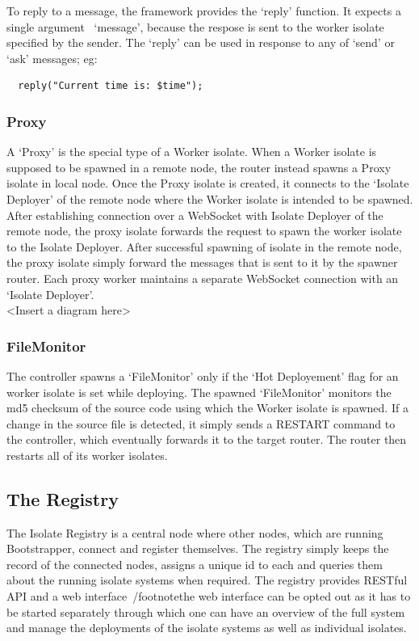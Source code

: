   To reply to a message, the framework provides the ‘reply’ function. It expects a single argument~\textemdash{} ‘message’, because the respose is sent to the worker isolate specified by the sender. The ‘reply’ can be used in response to any of ‘send’ or ‘ask’ messages; eg:
\begin{lstlisting}
  reply("Current time is: $time");
\end{lstlisting}

  \subsubsection{Proxy}
  A ‘Proxy’ is the special type of a Worker isolate. When a Worker isolate is supposed to be spawned in a remote node, the router instead spawns a Proxy isolate in local node. Once the Proxy isolate is created, it connects to the ‘Isolate Deployer’ of the remote node where the Worker isolate is intended to be spawned. After establishing connection over a WebSocket with Isolate Deployer of the remote node, the proxy isolate forwards the request to spawn the worker isolate to the Isolate Deployer. After successful spawning of isolate in the remote node, the proxy isolate simply forward the messages that is sent to it by the spawner router. Each proxy worker maintains a separate WebSocket connection with an ‘Isolate Deployer’.\\
  <Insert a diagram here>

  \subsubsection{FileMonitor}
  \label{subsubsec:fileMonitor}
  The controller spawns a ‘FileMonitor’ only if the ‘Hot Deployement’ flag for an worker isolate is set while deploying. The spawned ‘FileMonitor’ monitors the md5 checksum of the source code using which the Worker isolate is spawned. If a change in the source file is detected, it simply sends a RESTART command to the controller, which eventually forwards it to the target router. The router then restarts all of its worker isolates.

\subsection{The Registry}
\label{subsec:registry}
The Isolate Registry is a central node where other nodes, which are running Bootstrapper, connect and register themselves. The registry simply keeps the record of the connected nodes, assigns a unique id to each and queries them about the running isolate systems when required. The registry provides RESTful API and a web interface~/footnote{the web interface can be opted out as it has to be started separately} through which one can have an overview of the full system and manage the deployments of the isolate systems as well as individual isolates.

